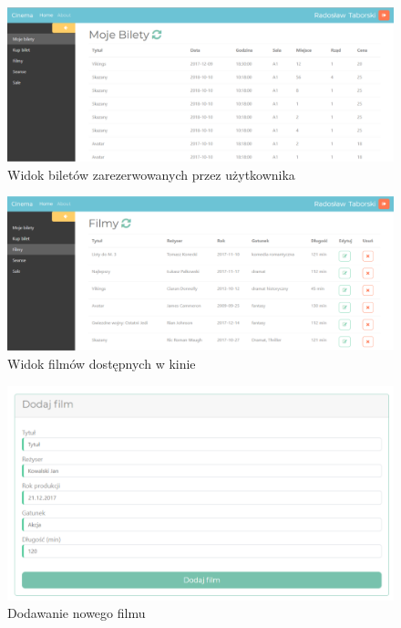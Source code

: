\begin{figure} [H]
	\centering
	\includegraphics[width=1\linewidth]{rozdzial05/interfejs/mojeBilety.png}
	\caption{Widok biletów zarezerwowanych przez użytkownika}
	\label{fig:screen3}
\end{figure}

\begin{figure} [H]
	\centering
	\includegraphics[width=1\linewidth]{rozdzial05/interfejs/filmy.png}
	\caption{Widok filmów dostępnych w kinie}
	\label{fig:screen4}
\end{figure}

\begin{figure} [H]
	\centering
	\includegraphics[width=1\linewidth]{rozdzial05/interfejs/dadajFilm.png}
	\caption{Dodawanie nowego filmu}
	\label{fig:screen5}
\end{figure}

